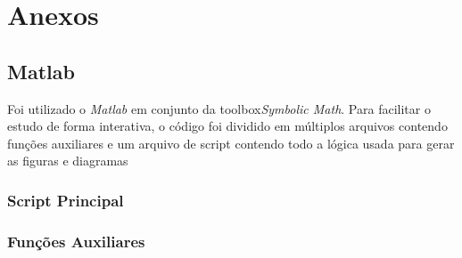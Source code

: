 \documentclass[a4paper,11pt]{article}
\begin{document}
\newpage


\newpage
\section*{Anexos}



\subsection*{Matlab}

Foi utilizado o \textit{Matlab} em conjunto da toolbox\textit{Symbolic Math}\cite{matlabsymbolic}. Para facilitar o estudo de forma interativa, o código foi dividido em múltiplos arquivos contendo funções auxiliares e um arquivo de script contendo todo a lógica usada para gerar as figuras e diagramas

\subsubsection*{Script Principal}


\subsubsection*{Funções Auxiliares}
\end{document}
